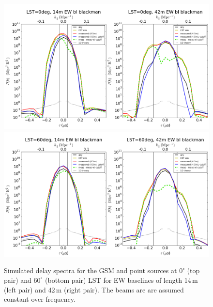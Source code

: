 \documentclass{emulateapj}
\begin{document}
\begin{figure}[h]
\includegraphics[width=6.7in]{LST0deg_14m_42m_EWbaselines_dish1_blackman.png}
\includegraphics[width=6.7in]{LST60deg_14m_42m_EWbaselines_dish1_blackman.png}
\caption{Simulated delay spectra for the GSM and point sources at $0^\circ$ (top pair) and $60^\circ$ (bottom pair) LST for EW baselines of length 14\,m (left pair) and 42\,m (right pair). The beams are are assumed constant over frequency.}
\label{fig:delayspec}
\end{figure}
\end{document}
